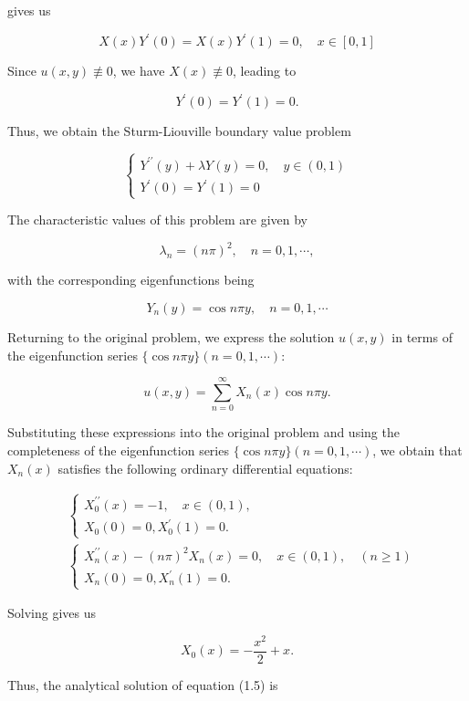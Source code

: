 \documentclass{article}
\begin{document}
gives us

$$
X(x) Y^{\prime}(0)=X(x) Y^{\prime}(1)=0, \quad x \in[0,1]
$$

Since \( u(x, y) \not \equiv 0 \), we have \( X(x) \not \equiv 0 \), leading to

$$
Y^{\prime}(0)=Y^{\prime}(1)=0 .
$$

Thus, we obtain the Sturm-Liouville boundary value problem

$$
\left\{\begin{array}{l}
Y^{\prime \prime}(y)+\lambda Y(y)=0, \quad y \in(0,1) \\
Y^{\prime}(0)=Y^{\prime}(1)=0
\end{array}\right.
$$

The characteristic values of this problem are given by

$$
\lambda_{n}=(n \pi)^{2}, \quad n=0,1, \cdots,
$$

with the corresponding eigenfunctions being

$$
Y_{n}(y)=\cos n \pi y, \quad n=0,1, \cdots
$$

Returning to the original problem, we express the solution \( u(x, y) \) in terms of the eigenfunction series \( \{\cos n \pi y\}(n=0, 1, \cdots) \):

$$
u(x, y)=\sum_{n=0}^{\infty} X_{n}(x) \cos n \pi y.
$$

Substituting these expressions into the original problem and using the completeness of the eigenfunction series \( \{\cos n \pi y\}(n=0,1,\cdots) \), we obtain that \( X_{n}(x) \) satisfies the following ordinary differential equations:

$$
\begin{aligned}
& \left\{\begin{array}{l}
X_{0}^{\prime \prime}(x)=-1, \quad x \in(0,1), \\
X_{0}(0)=0, X_{0}^{\prime}(1)=0 .
\end{array}\right.\\
& \left\{\begin{array}{l}
X_{n}^{\prime \prime}(x)-(n \pi)^{2} X_{n}(x)=0, \quad x \in(0,1), \quad(n \geq 1) \\
X_{n}(0)=0, X_{n}^{\prime}(1)=0 .
\end{array}\right.
\end{aligned}
$$

Solving gives us

$$
X_{0}(x)=-\frac{x^{2}}{2}+x.
$$

Thus, the analytical solution of equation (1.5) is
\end{document}
